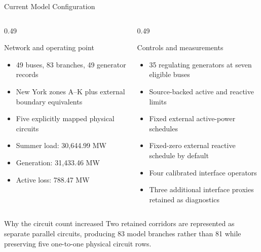 \documentclass[aspectratio=169,10pt]{beamer}
\begin{document}
\begin{frame}{Current Model Configuration}
\small
\begin{columns}[T,onlytextwidth]
\begin{column}{0.49\linewidth}
\begin{block}{Network and operating point}
\begin{itemize}
  \item 49 buses, 83 branches, 49 generator records
  \item New York zones A--K plus external boundary equivalents
  \item Five explicitly mapped physical circuits
  \item Summer load: 30,644.99 MW
  \item Generation: 31,433.46 MW
  \item Active loss: 788.47 MW
\end{itemize}
\end{block}
\end{column}
\begin{column}{0.49\linewidth}
\begin{block}{Controls and measurements}
\begin{itemize}
  \item 35 regulating generators at seven eligible buses
  \item Source-backed active and reactive limits
  \item Fixed external active-power schedules
  \item Fixed-zero external reactive schedule by default
  \item Four calibrated interface operators
  \item Three additional interface proxies retained as diagnostics
\end{itemize}
\end{block}
\end{column}
\end{columns}

\begin{exampleblock}{Why the circuit count increased}
Two retained corridors are represented as separate parallel circuits, producing 83 model branches rather than 81 while preserving five one-to-one physical circuit rows.
\end{exampleblock}
\end{frame}
\end{document}

